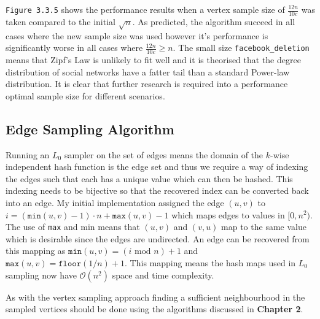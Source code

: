 \documentclass[11pt,twoside,a4paper]{report}
\begin{document}
\texttt{Figure 3.3.5} shows the performance results when a vertex sample size of $\frac{12n}{10c}$ was taken compared to the initial $\sqrt{n}$. As predicted, the algorithm succeed in all cases where the new sample size was used however it's performance is significantly worse in all cases where $\frac{12n}{10c}\geq n$. The small size \texttt{facebook\_deletion} means that Zipf's Law is unlikely to fit well and it is theorised that the degree distribution of social networks have a fatter tail than a standard Power-law distribution. It is clear that further research is required into a performance optimal sample size for different scenarios.

\subsection{Edge Sampling Algorithm}

Running an $L_0$ sampler on the set of edges means the domain of the $k$-wise independent hash function is the edge set and thus we require a way of indexing the edges such that each has a unique value which can then be hashed. This indexing needs to be bijective so that the recovered index can be converted back into an edge. My initial implementation assigned the edge $(u,v)$ to $i=(\mathtt{min}(u,v)-1)\cdot n+\mathtt{max}(u,v)-1$ which maps edges to values in $[0,n^2)$. The use of \texttt{max} and min means that $(u,v)$ and $(v,u)$ map to the same value which is desirable since the edges are undirected. An edge can be recovered from this mapping as $\mathtt{min}(u,v)=(i\text{ mod }n)+1$ and $\mathtt{max}(u,v)=\mathtt{floor}(1/n)+1$. This mapping means the hash maps used in $L_0$ sampling now have $\mathcal{O}(n^2)$ space and time complexity. %
\par As with the vertex sampling approach finding a sufficient neighbourhood in the sampled vertices should be done using the algorithms discussed in \textbf{Chapter 2}.
\end{document}
